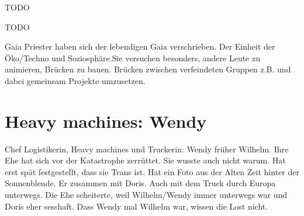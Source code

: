 \begin{npcBox}[title=Laura, Gaianistin]
    \begin{consequences}
    \item {}
    \item {}
    \item {}
    \end{consequences}

    \begin{npcDescription}
    TODO
    \end{npcDescription}


    \begin{equipment}
    \item TODO
    \end{equipment}
\end{npcBox}


Gaia Priester haben sich der lebendigen Gaia verschrieben. Der Einheit der Öko/Techno und Soziosphäre.Sie versuchen besonders, andere Leute zu animieren,  Brücken zu bauen. Brücken zwischen verfeindeten Gruppen z.B. und dabei gemeinsam Projekte umzusetzen.

\newpage


\section{Heavy machines: Wendy}

Chef Logistikerin, Heavy machines und Truckerin: Wendy früher Wilhelm. Ihre Ehe hat sich vor der Katastrophe zerrüttet. Sie wusste auch nicht warum. Hat erst spät festgestellt, dass sie Trans ist. Hat ein Foto aus der Alten Zeit hinter der Sonnenblende. Er zusammen mit Doris. Auch mit dem Truck durch Europa unterwegs. Die Ehe scheiterte, weil Wilhelm/Wendy immer unterwegs war und Doris eher sesshaft. Dass Wendy mal Wilhelm war, wissen die Lost nicht.

